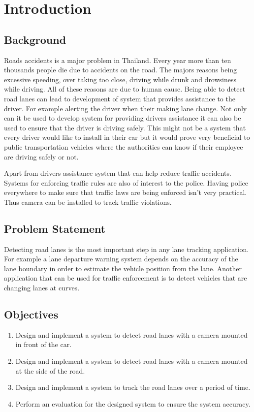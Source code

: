 \setlength{\footskip}{8mm}
\chapter{Introduction} \label{introduction}
\label{sec:Introduction}

\section{Background} 
Roads accidents is a major problem in Thailand. Every year more than ten
thousands people die due to accidents on the road. The majors reasons being
excessive speeding, over taking too close, driving while drunk and drowsiness
while driving. All of these reasons are due to human cause. Being able to 
detect road lanes can lead to development of system that provides assistance to 
the driver. For example alerting the driver when their making lane change. Not 
only can it be used to develop system for providing drivers assistance it can 
also be used to ensure that the driver is driving safely. This might not be a 
system that every driver would like to install in their car but it would prove 
very beneficial to public transportation vehicles where the authorities can know 
if their employee are driving safely or not. 

Apart from drivers assistance system that can help reduce traffic accidents. 
Systems for enforcing traffic rules are also of interest to the police. 
Having police everywhere to make sure that traffic laws are being enforced isn't very practical. Thus camera can be installed to track traffic violations. 

\section{Problem Statement}
Detecting road lanes is the most important step in any lane tracking 
application. For example a lane departure warning system depends on the accuracy 
of the lane boundary in order to estimate the vehicle position from the lane. 
Another application that can be used for traffic enforcement is to detect 
vehicles that are changing lanes at curves. 

\section{Objectives}
\begin{enumerate} 
  \item Design and implement a system to detect road lanes with a camera mounted in front of the car. 
  \item Design and implement a system to detect road lanes with a camera mounted at the side of the road. 
  \item Design and implement a system to track the road lanes over a period of time. 
  \item Perform an evaluation for the designed system to ensure the system accuracy. 
\end{enumerate}

